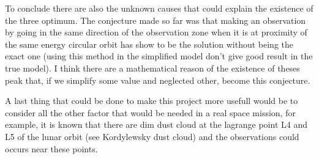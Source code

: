 \documentclass[11pt]{article} %
\begin{document}
			 To conclude there are also the unknown causes that could explain the existence of the three optimum. The conjecture made so far was that making an observation by going in the same direction of the observation zone when it is at proximity of the same energy circular orbit has show to be the solution without being the exact one (using this method in the simplified model don't give good result in the true model). I think there are a mathematical reason of the existence of theses peak that, if we simplify some value and neglected other, become this conjecture.
			 
			 A last thing that could be done to make this project more usefull would be to consider all the other factor that would be needed in a real space mission, for example, it is known that there are dim dust cloud at the lagrange point L4 and L5 of the lunar orbit (see Kordylewsky dust cloud) and the observations could occurs near these points. 
		
\end{document}

